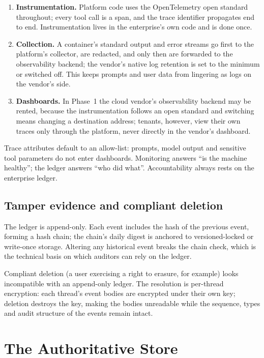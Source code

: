 \begin{enumerate}
  \item \textbf{Instrumentation.} Platform code uses the OpenTelemetry open standard throughout; every tool call is a span, and the trace identifier propagates end to end. Instrumentation lives in the enterprise's own code and is done once.
  \item \textbf{Collection.} A container's standard output and error streams go first to the platform's collector, are redacted, and only then are forwarded to the observability backend; the vendor's native log retention is set to the minimum or switched off. This keeps prompts and user data from lingering as logs on the vendor's side.
  \item \textbf{Dashboards.} In Phase~1 the cloud vendor's observability backend may be rented, because the instrumentation follows an open standard and switching means changing a destination address; tenants, however, view their own traces only through the platform, never directly in the vendor's dashboard.
\end{enumerate}

Trace attributes default to an allow-list: prompts, model output and sensitive tool parameters do not enter dashboards. Monitoring answers ``is the machine healthy''; the ledger answers ``who did what''. Accountability always rests on the enterprise ledger.

\subsection{Tamper evidence and compliant deletion}

The ledger is append-only. Each event includes the hash of the previous event, forming a hash chain; the chain's daily digest is anchored to versioned-locked or write-once storage. Altering any historical event breaks the chain check, which is the technical basis on which auditors can rely on the ledger.

Compliant deletion (a user exercising a right to erasure, for example) looks incompatible with an append-only ledger. The resolution is per-thread encryption: each thread's event bodies are encrypted under their own key; deletion destroys the key, making the bodies unreadable while the sequence, types and audit structure of the events remain intact.

\section{The Authoritative Store}
\label{sec:storage}

